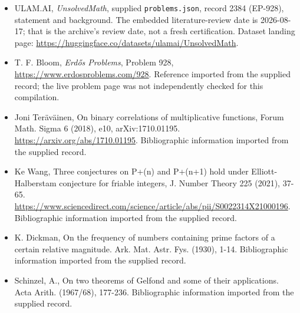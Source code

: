 \documentclass[11pt,a4paper]{article}
\begin{document}
{\small

\begin{itemize}

\item[\hypertarget{source:2384:1}{S1}] ULAM.AI, \emph{UnsolvedMath}, supplied \texttt{problems.json}, record 2384 (EP-928), statement and background. The embedded literature-review date is 2026-08-17; that is the archive’s review date, not a fresh certification. Dataset landing page: \url{https://huggingface.co/datasets/ulamai/UnsolvedMath}.

\item[\hypertarget{source:2384:2}{S2}] T. F. Bloom, \emph{Erdős Problems}, Problem 928, \url{https://www.erdosproblems.com/928}. Reference imported from the supplied record; the live problem page was not independently checked for this compilation.

\item[\hypertarget{source:2384:3}{S3}] Joni Teräväinen, On binary correlations of multiplicative functions, Forum Math. Sigma 6 (2018), e10, arXiv:1710.01195. \url{https://arxiv.org/abs/1710.01195}. Bibliographic information imported from the supplied record.

\item[\hypertarget{source:2384:4}{S4}] Ke Wang, Three conjectures on P+(n) and P+(n+1) hold under Elliott-Halberstam conjecture for friable integers, J. Number Theory 225 (2021), 37-65. \url{https://www.sciencedirect.com/science/article/abs/pii/S0022314X21000196}. Bibliographic information imported from the supplied record.

\item[\hypertarget{source:2384:5}{S5}] K. Dickman, On the frequency of numbers containing prime factors of a certain relative magnitude. Ark. Mat. Astr. Fys. (1930), 1-14. Bibliographic information imported from the supplied record.

\item[\hypertarget{source:2384:6}{S6}] Schinzel, A., On two theorems of Gelfond and some of their applications. Acta Arith. (1967/68), 177-236. Bibliographic information imported from the supplied record.

\end{itemize}

}

\label{end:2384}
\end{document}
